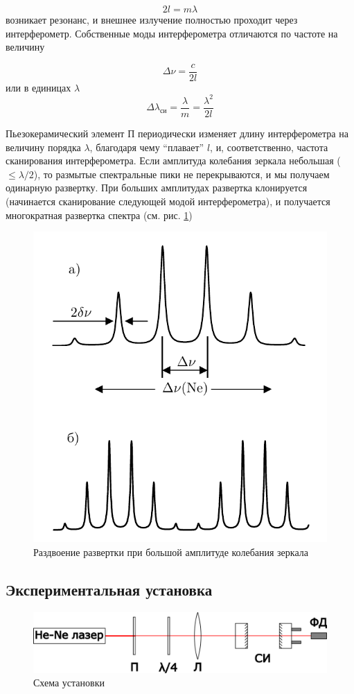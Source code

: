 \begin{equation}
    2l=m\lambda
    \label{eq:fabri_resonanse}
\end{equation}
возникает резонанс, и внешнее излучение полностью проходит через интерферометр. Собственные моды интерферометра отличаются по частоте на величину

\begin{equation}
    \Delta \nu = \frac{c}{2l}
    \label{eq:mode_distance_freq_fabri}
\end{equation}
или в единицах $\lambda$
\begin{equation}
    \Delta \lambda_{\text{си}} = \frac{\lambda}{m} = \frac{\lambda^2}{2l}
    \label{eq:mode_distance_lambda_fabri}
\end{equation}

Пьезокерамический элемент П периодически изменяет длину интерферометра на величину порядка $\lambda$, благодаря чему ``плавает'' $l$, и, соответственно, частота сканирования интерферометра. Если амплитуда колебания зеркала небольшая ($\leq \lambda/2$), то размытые спектральные пики не перекрываются, и мы получаем одинарную развертку. При больших амплитудах развертка клонируется (начинается сканирование следующей модой интерферометра), и получается многократная развертка спектра (см. рис. \ref{fig:clone_spectrum})

\begin{figure}[h]
    \center\includegraphics[width = 0.6\linewidth]{clone_spectrum.png}
    \caption{Раздвоение развертки при большой амплитуде колебания зеркала}\label{fig:clone_spectrum}
\end{figure}

\newpage
\subsection{Экспериментальная установка}
\begin{figure}[h]
    \center\includegraphics[width=0.9\linewidth]{ustanovka.png}
    \caption{Схема установки}\label{fig:ustanovka}
\end{figure}

